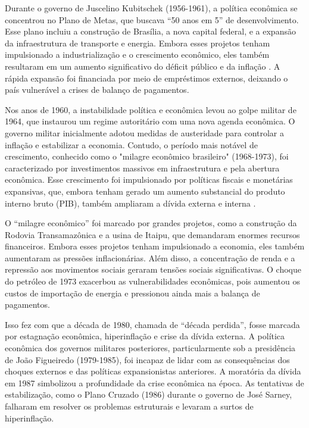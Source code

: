 \documentclass[12pt,oneside,a4paper,chapter=TITLE,english,brazil,sumario=abnt-6027-2012]{abntex2}
\begin{document}
Durante o governo de Juscelino Kubitschek (1956-1961), a política econômica se concentrou no Plano de Metas, que buscava ``50 anos em 5'' de desenvolvimento. Esse plano incluiu a construção de Brasília, a nova capital federal, e a expansão da infraestrutura de transporte e energia. Embora esses projetos tenham impulsionado a industrialização e o crescimento econômico, eles também resultaram em um aumento significativo do déficit público e da inflação \cite{bielschowsky_2022_a}. A rápida expansão foi financiada por meio de empréstimos externos, deixando o país vulnerável a crises de balanço de pagamentos.

Nos anos de 1960, a instabilidade política e econômica levou ao golpe militar de 1964, que instaurou um regime autoritário com uma nova agenda econômica. O governo militar inicialmente adotou medidas de austeridade para controlar a inflação e estabilizar a economia. Contudo, o período mais notável de crescimento, conhecido como o "milagre econômico brasileiro" (1968-1973), foi caracterizado por investimentos massivos em infraestrutura e pela abertura econômica. Esse crescimento foi impulsionado por políticas fiscais e monetárias expansivas, que, embora tenham gerado um aumento substancial do produto interno bruto (PIB), também ampliaram a dívida externa e interna \cite{amaurypatrickgremaud_2009_economia}.

O ``milagre econômico'' foi marcado por grandes projetos, como a construção da Rodovia Transamazônica e a usina de Itaipu, que demandaram enormes recursos financeiros. Embora esses projetos tenham impulsionado a economia, eles também aumentaram as pressões inflacionárias. Além disso, a concentração de renda e a repressão aos movimentos sociais geraram tensões sociais significativas. O choque do petróleo de 1973 exacerbou as vulnerabilidades econômicas, pois aumentou os custos de importação de energia e pressionou ainda mais a balança de pagamentos.

Isso fez com que a década de 1980, chamada de ``década perdida'', fosse marcada por estagnação econômica, hiperinflação e crise da dívida externa. A política econômica dos governos militares posteriores, particularmente sob a presidência de João Figueiredo (1979-1985), foi incapaz de lidar com as consequências dos choques externos e das políticas expansionistas anteriores. A moratória da dívida em 1987 simbolizou a profundidade da crise econômica \cite{fabiogiambiagi_2016_economia} na época. As tentativas de estabilização, como o Plano Cruzado (1986) durante o governo de José Sarney, falharam em resolver os problemas estruturais e levaram a surtos de hiperinflação.
\end{document}
